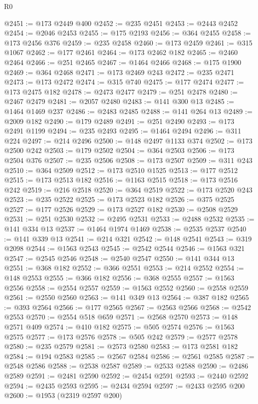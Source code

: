 \begin{lexlean}{R0}
\begin{coremodule}
@2451 := @173 @2449 @400
@2452 := @235 @2451
@2453 := @2443 @2452
@2454 := @2046 @2453
@2455 := @175 @2193
@2456 := @364 @2455
@2458 := @173 @2456 @376
@2459 := @235 @2458
@2460 := @173 @2459
@2461 := @315 @1067
@2462 := @177 @2461
@2464 := @173 @2462 @182
@2465 := @2460 @2464
@2466 := @251 @2465
@2467 := @1464 @2466
@2468 := @175 @1900
@2469 := @364 @2468
@2471 := @173 @2469 @243
@2472 := @235 @2471
@2473 := @173 @2472
@2474 := @315 @740
@2475 := @177 @2474
@2477 := @173 @2475 @182
@2478 := @2473 @2477
@2479 := @251 @2478
@2480 := @2467 @2479
@2481 := @2057 @2480
@2483 := @141 @300 @13
@2485 := @1464 @1469 @237
@2486 := @2483 @2485
@2488 := @141 @264 @13
@2489 := @2009 @182
@2490 := @179 @2489
@2491 := @251 @2490
@2493 := @173 @2491 @1199
@2494 := @235 @2493
@2495 := @1464 @2494
@2496 := @311 @224
@2497 := @214 @2496
@2500 := @148 @2497 @1133 @374
@2502 := @173 @2500 @242
@2503 := @179 @2502
@2504 := @364 @2503
@2506 := @173 @2504 @376
@2507 := @235 @2506
@2508 := @173 @2507
@2509 := @311 @243
@2510 := @364 @2509
@2512 := @173 @2510 @1525
@2513 := @177 @2512
@2515 := @173 @2513 @182
@2516 := @1163 @2515
@2518 := @173 @2516 @242
@2519 := @216 @2518
@2520 := @364 @2519
@2522 := @173 @2520 @243
@2523 := @235 @2522
@2525 := @173 @2523 @182
@2526 := @375 @2525
@2527 := @177 @2526
@2529 := @173 @2527 @182
@2530 := @2508 @2529
@2531 := @251 @2530
@2532 := @2495 @2531
@2533 := @2488 @2532
@2535 := @141 @334 @13
@2537 := @1464 @1974 @1469
@2538 := @2535 @2537
@2540 := @141 @339 @13
@2541 := @214 @321
@2542 := @148 @2541
@2543 := @319 @2098
@2544 := @1563 @2543
@2545 := @2542 @2544
@2546 := @1563 @321
@2547 := @2545 @2546
@2548 := @2540 @2547
@2550 := @141 @344 @13
@2551 := @368 @182
@2552 := @366 @2551
@2553 := @214 @2552
@2554 := @148 @2553
@2555 := @366 @182
@2556 := @368 @2555
@2557 := @1563 @2556
@2558 := @2554 @2557
@2559 := @1563 @2552
@2560 := @2558 @2559
@2561 := @2550 @2560
@2563 := @141 @349 @13
@2564 := @387 @182
@2565 := @393 @2564
@2566 := @177 @2565
@2567 := @2563 @2566
@2568 := @2542 @2553
@2570 := @2554 @518 @659
@2571 := @2568 @2570
@2573 := @148 @2571 @409
@2574 := @410 @182
@2575 := @505 @2574
@2576 := @1563 @2575
@2577 := @173 @2576
@2578 := @505 @242
@2579 := @2577 @2578
@2580 := @235 @2579
@2581 := @2573 @2580
@2583 := @173 @2581 @182
@2584 := @194 @2583
@2585 := @2567 @2584
@2586 := @2561 @2585
@2587 := @2548 @2586
@2588 := @2538 @2587
@2589 := @2533 @2588
@2590 := @2486 @2589
@2591 := @2481 @2590
@2592 := @2454 @2591
@2593 := @2440 @2592
@2594 := @2435 @2593
@2595 := @2434 @2594
@2597 := @2433 @2595 @200
@2600 := @1953 (@2319 @2597 @200)

\end{coremodule}
\end{lexlean}
